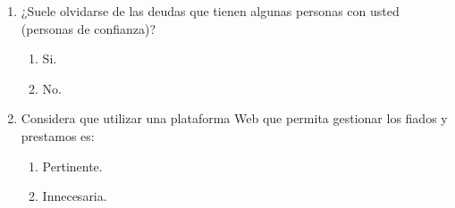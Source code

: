 {\begin{enumerate}
		\item ¿Suele olvidarse de las deudas que tienen algunas personas con usted (personas de confianza)?
		
			\begin{enumerate}
				\item Si.
				\item No.
			\end{enumerate}	
		
		\item Considera que utilizar una plataforma Web que permita gestionar los fiados y prestamos es:
		
			\begin{enumerate}
				\item Pertinente.
				\item Innecesaria.
			\end{enumerate}
		
	\end{enumerate}
	}
	

	